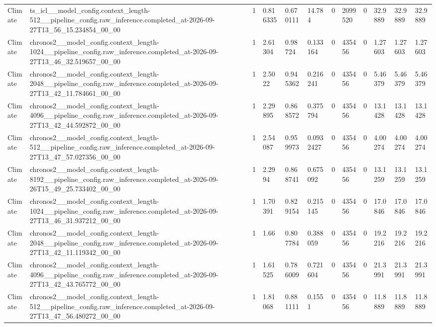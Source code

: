 \begin{tabular}{llllllllllll}
Climate & ts\_icl\_\_model\_config.context\_length-512\_\_pipeline\_config.raw\_inference.completed\_at-2026-09-27T13\_56\_15.234854\_00\_00 & 1 & 0.816335 & 0.670111 & 14.784 & 0 & 2099520 & 0 & 32.9889 & 32.9889 & 32.9889 \\
Climate & chronos2\_\_model\_config.context\_length-1024\_\_pipeline\_config.raw\_inference.completed\_at-2026-09-27T13\_46\_32.519657\_00\_00 & 1 & 2.61304 & 0.98724 & 0.133164 & 0 & 435456 & 0 & 1.27603 & 1.27603 & 1.27603 \\
Climate & chronos2\_\_model\_config.context\_length-2048\_\_pipeline\_config.raw\_inference.completed\_at-2026-09-27T13\_42\_11.784661\_00\_00 & 1 & 2.5022 & 0.945362 & 0.216241 & 0 & 435456 & 0 & 5.46379 & 5.46379 & 5.46379 \\
Climate & chronos2\_\_model\_config.context\_length-4096\_\_pipeline\_config.raw\_inference.completed\_at-2026-09-27T13\_42\_44.592872\_00\_00 & 1 & 2.29895 & 0.868572 & 0.375794 & 0 & 435456 & 0 & 13.1428 & 13.1428 & 13.1428 \\
Climate & chronos2\_\_model\_config.context\_length-512\_\_pipeline\_config.raw\_inference.completed\_at-2026-09-27T13\_47\_57.027356\_00\_00 & 1 & 2.54087 & 0.959973 & 0.0932427 & 0 & 435456 & 0 & 4.00274 & 4.00274 & 4.00274 \\
Climate & chronos2\_\_model\_config.context\_length-8192\_\_pipeline\_config.raw\_inference.completed\_at-2026-09-26T15\_49\_25.733402\_00\_00 & 1 & 2.2994 & 0.868741 & 0.675092 & 0 & 435456 & 0 & 13.1259 & 13.1259 & 13.1259 \\
Climate & chronos2\_\_model\_config.context\_length-1024\_\_pipeline\_config.raw\_inference.completed\_at-2026-09-27T13\_46\_31.937212\_00\_00 & 1 & 1.70391 & 0.829154 & 0.215145 & 0 & 435456 & 0 & 17.0846 & 17.0846 & 17.0846 \\
Climate & chronos2\_\_model\_config.context\_length-2048\_\_pipeline\_config.raw\_inference.completed\_at-2026-09-27T13\_42\_11.119342\_00\_00 & 1 & 1.66 & 0.807784 & 0.388059 & 0 & 435456 & 0 & 19.2216 & 19.2216 & 19.2216 \\
Climate & chronos2\_\_model\_config.context\_length-4096\_\_pipeline\_config.raw\_inference.completed\_at-2026-09-27T13\_42\_43.765772\_00\_00 & 1 & 1.61525 & 0.786009 & 0.721604 & 0 & 435456 & 0 & 21.3991 & 21.3991 & 21.3991 \\
Climate & chronos2\_\_model\_config.context\_length-512\_\_pipeline\_config.raw\_inference.completed\_at-2026-09-27T13\_47\_56.480272\_00\_00 & 1 & 1.81068 & 0.881111 & 0.1551 & 0 & 435456 & 0 & 11.8889 & 11.8889 & 11.8889 \\

\end{tabular}
